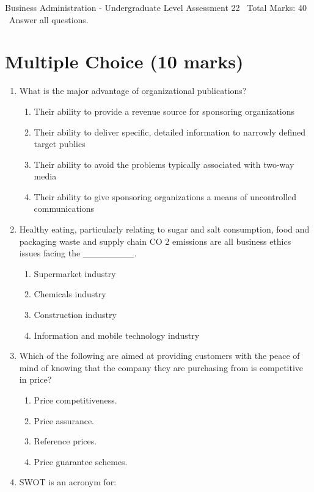 \documentclass[12pt]{article}
\begin{document}
\begin{center}
Business Administration - Undergraduate Level Assessment 22 \
Total Marks: 40 \
Answer all questions.
\end{center}

\section*{Multiple Choice (10 marks)}
\begin{enumerate}[label=\arabic*.]
\item What is the major advantage of organizational publications?
\begin{enumerate}[label=(\alph*)]
    \item Their ability to provide a revenue source for sponsoring organizations
    \item Their ability to deliver specific, detailed information to narrowly defined target publics
    \item Their ability to avoid the problems typically associated with two-way media
    \item Their ability to give sponsoring organizations a means of uncontrolled communications
\end{enumerate}
\item Healthy eating, particularly relating to sugar and salt consumption, food and packaging waste and supply chain CO 2 emissions are all business ethics issues facing the \_\_\_\_\_\_\_\_.
\begin{enumerate}[label=(\alph*)]
    \item Supermarket industry
    \item Chemicals industry
    \item Construction industry
    \item Information and mobile technology industry
\end{enumerate}
\item Which of the following are aimed at providing customers with the peace of mind of knowing that the company they are purchasing from is competitive in price?
\begin{enumerate}[label=(\alph*)]
    \item Price competitiveness.
    \item Price assurance.
    \item Reference prices.
    \item Price guarantee schemes.
\end{enumerate}
\item SWOT is an acronym for:

\end{enumerate}
\end{document}
